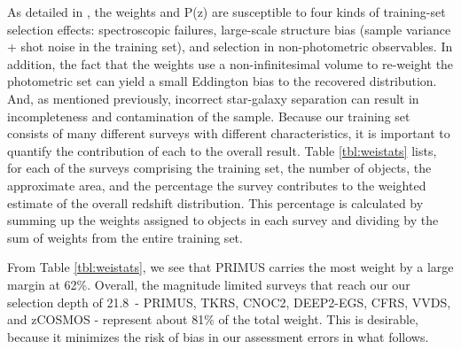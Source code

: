 \documentclass[preprint]{aastex}
\newcommand{\rmax}{21.8}
\begin{document}
As detailed in \cite{CunhaPhotoz09}, the weights and P(z) are susceptible to
four kinds of training-set selection effects: spectroscopic failures,
large-scale structure bias (sample variance + shot noise in the training set),
and selection in non-photometric observables.  In addition, the fact that the
weights use a non-infinitesimal volume to re-weight the photometric set can
yield a small Eddington bias to the recovered distribution.  And, as mentioned
previously, incorrect star-galaxy separation can result in incompleteness and
contamination of the sample.  Because our training set consists of many
different surveys with different characteristics, it is important to quantify
the contribution of each to the overall result.  Table \ref{tbl:weistats}
lists, for each of the surveys comprising the training set, the number of
objects, the approximate area, and the percentage the survey contributes to the
weighted estimate of the overall redshift distribution.  This percentage is
calculated by summing up the weights assigned to objects in each survey and
dividing by the sum of weights from the entire training set.


From Table \ref{tbl:weistats}, we see that PRIMUS carries the most weight by a
large margin at 62\%.  Overall, the magnitude limited surveys that reach our
our selection depth of \rmax\ - PRIMUS, TKRS, CNOC2, DEEP2-EGS, CFRS, VVDS, and
zCOSMOS - represent about 81$\%$ of the total weight.  This is desirable,
because it minimizes the risk of bias in our assessment errors in what follows.
\end{document}
